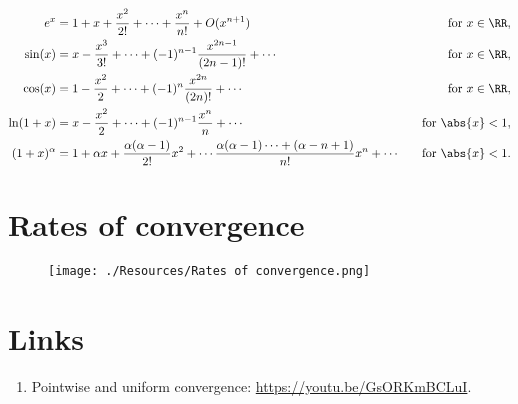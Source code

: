 \documentclass[12pt, a4paper]{article}
\begin{document}
\[\begin{aligned}
    e^x &= 1+x+\frac{x^2}{2!}+\cdots +\frac{x^n}{n!} +O(x^{n+1})  \quad &\text{for } x \in \RR, \\
    \sin(x) &= x-\frac{x^3}{3!} + \cdots + (-1)^{n-1} \frac{x^{2n-1}}{(2n-1)!} + \cdots \quad &\text{for } x \in \RR, \\
    \cos(x) &= 1 -\frac{x^2}{2} + \cdots + (-1)^n \frac{x^{2n}}{(2n)!} +\cdots \quad &\text{for } x \in \RR,\\
    \ln(1+x) &= x - \frac{x^2}{2} +\cdots + (-1)^{n-1} \frac{x^n}{n} +\cdots \quad &\text{for } \abs{x}<1, \\
    (1+x)^{\alpha} &= 1+\alpha x +\frac{\alpha(\alpha-1)}{2!} x^2 +\cdots \frac{\alpha(\alpha-1)\cdots +(\alpha-n+1)}{n!} x^n+\cdots \quad &\text{for } \abs{x}<1.
\end{aligned}\]

\section{Rates of convergence}

\begin{figure}[H]
     \begin{center}
         \texttt{[image: ./Resources/Rates of convergence.png]}
     \end{center}
\end{figure}

\section{Links}

\begin{enumerate}
    \item Pointwise and uniform convergence: \url{https://youtu.be/GsORKmBCLuI}.
\end{enumerate}
\end{document}
